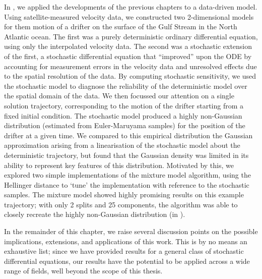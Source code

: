 In , we applied the developments of the previous chapters to a data-driven model.
Using satellite-measured velocity data, we constructed two 2-dimensional models for them motion of a drifter on the surface of the Gulf Stream in the North Atlantic ocean.
The first was a purely deterministic ordinary differential equation, using only the interpolated velocity data.
The second was a stochastic extension of the first, a stochastic differential equation that ``improved'' upon the ODE by accounting for measurement errors in the velocity data and unresolved effects due to the spatial resolution of the data.
By computing stochastic sensitivity, we used the stochastic model to diagnose the reliability of the deterministic model over the spatial domain of the data.
We then focussed our attention on a single solution trajectory, corresponding to the motion of the drifter starting from a fixed initial condition.
The stochastic model produced a highly non-Gaussian distribution (estimated from Euler-Maruyama samples) for the position of the drifter at a given time.
We compared to this empirical distribution the Gaussian approximation arising from a linearisation of the stochastic model about the deterministic trajectory, but found that the Gaussian density was limited in its ability to represent key features of this distribution.
Motivated by this, we explored two simple implementations of the mixture model algorithm, using the Hellinger distance to `tune' the implementation with reference to the stochastic samples.
The mixture model showed highly promising results on this example trajectory; with only 2 splits and 25 components, the algorithm was able to closely recreate the highly non-Gaussian distribution (in ).

In the remainder of this chapter, we raise several discussion points on the possible implications, extensions, and applications of this work.
This is by no means an exhaustive list; since we have provided results for a general class of stochastic differential equations, our results have the potential to be applied across a wide range of fields, well beyond the scope of this thesis.




